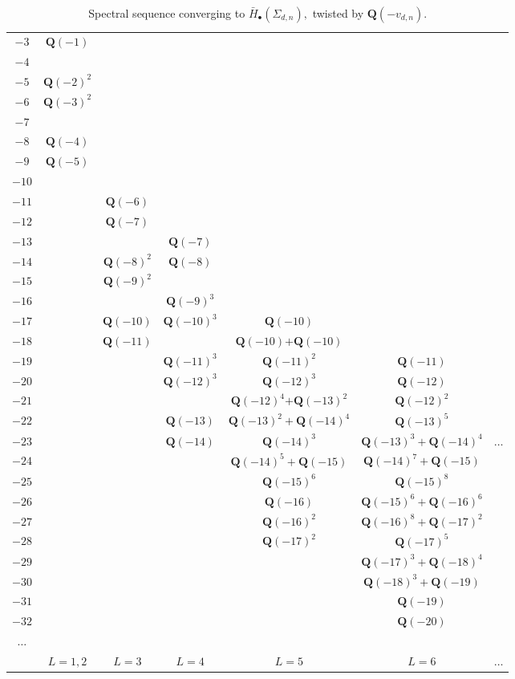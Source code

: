 \documentclass[10pt,a4paper,twoside]{amsart}
\theoremstyle{plain}
\theoremstyle{definition}
\theoremstyle{remark}
\begin{document}
\begin{table}[ht!]\caption{Spectral sequence converging to $\bar{H}_\bullet(\Sigma_{d,n}),$ twisted by $\mathbf{Q}(-v_{d,n}).$}\centering
\begin{tabular}{c|cccccc}
$-3$&$\mathbf{Q}(-1)$&&&&&\\
$-4$&&&&&&\\
$-5$&$\mathbf{Q}(-2)^2$&&&&&\\
$-6$&$\mathbf{Q}(-3)^2$&&&&&\\
$-7$&&&&&&\\
$-8$&$\mathbf{Q}(-4)$&&&&&\\
$-9$&$\mathbf{Q}(-5)$&&&&&\\
$-10$&&&&&&\\
$-11$&&$\mathbf{Q}(-6)$&&&&\\
$-12$&&$\mathbf{Q}(-7)$&&&&\\
$-13$&&&$\mathbf{Q}(-7)$&&&\\
$-14$&&{$\mathbf{Q}(-8)^2$}&{$\mathbf{Q}(-8)$}&&&\\
$-15$&&$\mathbf{Q}(-9)^2$&&&&\\
$-16$&&&$\mathbf{Q}(-9)^3$&&&\\
$-17$&& $\mathbf{Q}(-10)$&$\mathbf{Q}(-10)^3$&\colorbox{red!25}{$\mathbf{Q}(-10)$}&&\\
$-18$&&$\mathbf{Q}(-11)$&& \colorbox{red!25}{$\mathbf{Q}(-10)$}$+\mathbf{Q}(-10)$&&\\
$-19$&&&$\mathbf{Q}(-11)^3$&$\mathbf{Q}(-11)^2$&$\mathbf{Q}(-11)$&\\
$-20$&&&$\mathbf{Q}(-12)^3$&$\mathbf{Q}(-12)^3$&$\mathbf{Q}(-12)$&\\
$-21$&&&&\colorbox{yellow!25}{$\mathbf{Q}(-12)^4$}$+\mathbf{Q}(-13)^2$&\colorbox{yellow!25}{$\mathbf{Q}(-12)^2$}&\\
$-22$&&&$\mathbf{Q}(-13)$&$\mathbf{Q}(-13)^2+\mathbf{Q}(-14)^4$&$\mathbf{Q}(-13)^5$&\\
$-23$&&&$\mathbf{Q}(-14)$&$\mathbf{Q}(-14)^3$&$\mathbf{Q}(-13)^3+\mathbf{Q}(-14)^4$&$\dots$\\
$-24$&&&&$\mathbf{Q}(-14)^5+\mathbf{Q}(-15)$&$\mathbf{Q}(-14)^7+\mathbf{Q}(-15)$&\\
$-25$&&&&$\mathbf{Q}(-15)^6$&$\mathbf{Q}(-15)^8$&\\
$-26$&&&&$\mathbf{Q}(-16)$&$\mathbf{Q}(-15)^6+\mathbf{Q}(-16)^6$&\\
$-27$&&&&$\mathbf{Q}(-16)^2$&$\mathbf{Q}(-16)^8+\mathbf{Q}(-17)^2$&\\
$-28$&&&&$\mathbf{Q}(-17)^2$&$\mathbf{Q}(-17)^5$&\\
$-29$&&&&&$\mathbf{Q}(-17)^3+\mathbf{Q}(-18)^4$&\\
$-30$&&&&&$\mathbf{Q}(-18)^3+\mathbf{Q}(-19)$&\\
$-31$&&&&&$\mathbf{Q}(-19)$&\\
$-32$&&&&&$\mathbf{Q}(-20)$&\\
$\dots$&&&&&&\\
\hline
&$L=1,2$&$L=3$&$L=4$&$L=5$&$L=6$&$\dots$
\end{tabular}
\label{Mainss_notdiv}
\end{table}
\end{document}
